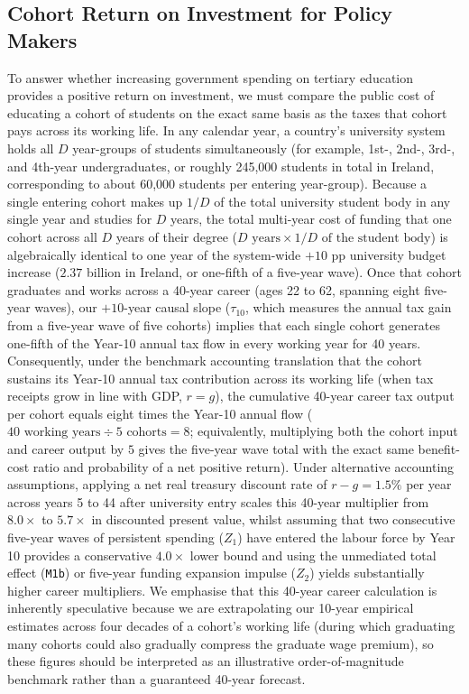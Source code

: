 \documentclass[11pt,a4paper]{article}
\begin{document}
\subsection{Cohort Return on Investment for Policy Makers}
\label{sec:roi}

To answer whether increasing government spending on tertiary education provides a positive return on investment, we must compare the public cost of educating a cohort of students on the exact same basis as the taxes that cohort pays across its working life. In any calendar year, a country's university system holds all $D$ year-groups of students simultaneously (for example, 1st-, 2nd-, 3rd-, and 4th-year undergraduates, or roughly 245,000 students in total in Ireland, corresponding to about 60,000 students per entering year-group). Because a single entering cohort makes up $1/D$ of the total university student body in any single year and studies for $D$ years, the total multi-year cost of funding that one cohort across all $D$ years of their degree ($D \text{ years} \times 1/D \text{ of the student body}$) is algebraically identical to one year of the system-wide $+10$ pp university budget increase (\texteuro$2.37$ billion in Ireland, or one-fifth of a five-year wave). Once that cohort graduates and works across a 40-year career (ages 22 to 62, spanning eight five-year waves), our $+10$-year causal slope ($\tau_{10}$, which measures the annual tax gain from a five-year wave of five cohorts) implies that each single cohort generates one-fifth of the Year-10 annual tax flow in every working year for 40 years. Consequently, under the benchmark accounting translation that the cohort sustains its Year-10 annual tax contribution across its working life (when tax receipts grow in line with GDP, $r = g$), the cumulative 40-year career tax output per cohort equals eight times the Year-10 annual flow ($40 \text{ working years} \div 5 \text{ cohorts} = 8$; equivalently, multiplying both the cohort input and career output by $5$ gives the five-year wave total with the exact same benefit-cost ratio and probability of a net positive return). Under alternative accounting assumptions, applying a net real treasury discount rate of $r - g = 1.5\%$ per year across years 5 to 44 after university entry scales this 40-year multiplier from $8.0\times$ to $5.7\times$ in discounted present value, whilst assuming that two consecutive five-year waves of persistent spending ($Z_1$) have entered the labour force by Year 10 provides a conservative $4.0\times$ lower bound and using the unmediated total effect (\texttt{M1b}) or five-year funding expansion impulse ($Z_2$) yields substantially higher career multipliers. We emphasise that this 40-year career calculation is inherently speculative because we are extrapolating our 10-year empirical estimates across four decades of a cohort's working life (during which graduating many cohorts could also gradually compress the graduate wage premium), so these figures should be interpreted as an illustrative order-of-magnitude benchmark rather than a guaranteed 40-year forecast.
\end{document}
